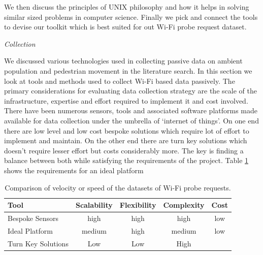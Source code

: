 We then discuss the principles of UNIX philosophy and how it helps in solving similar sized problems in computer science. Finally we pick and connect the tools to devise our toolkit which is best suited for out Wi-Fi probe request dataset.


\vspace{1.5em}\noindent\textit{Collection}\vspace{0.5em}

We discussed various technologies used in collecting passive data on ambient population and pedestrian movement in the literature search.
In this section we look at tools and methods used to collect Wi-Fi based data passively.
The primary considerations for evaluating data collection strategy are the scale of the infrastructure, expertise and effort required to implement it and cost involved.
There have been numerous sensors, tools and associated software platforms made available for data collection under the umbrella of `internet of things'.
On one end there are low level and low cost bespoke solutions which require lot of effort to implement and maintain.
On the other end there are turn key solutions which doesn't require lesser effort but costs considerably more.
The key is finding a balance between both while satisfying the requirements of the project.
Table \ref{table:toolkit:collection} shows the requirements for an ideal platform

\begin{table}[h]
  \footnotesize
  \begin{center}
    \begin{tabular}{lcccc}
      \toprule
      Tool & Scalability & Flexibility & Complexity & Cost \\
      \midrule
      Bespoke Sensors & high & high & high & low \\
      \color{blue}Ideal Platform & medium & high & medium & low \\
      Turn Key Solutions & Low & Low & High \\
      \bottomrule
    \end{tabular}
  \end{center}
  \caption{Comparison of velocity or speed of the datasets of Wi-Fi probe requests.}
  \label{table:toolkit:collection}
\end{table}


